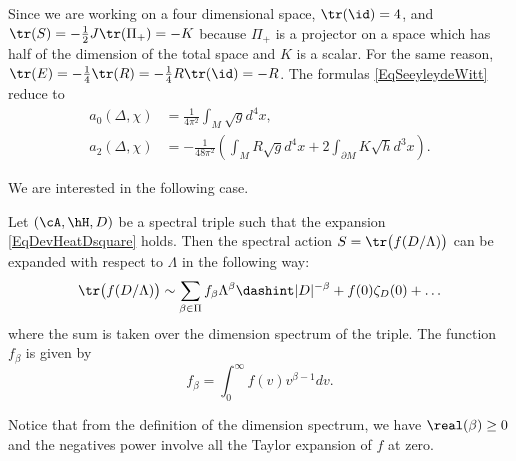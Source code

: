 Since we are working on a four dimensional space, $\tr(\id)=4$, and $\tr(S)=-\frac{ 1 }{2}J\tr(\Pi_+)=-K$ because $\Pi_+$ is a projector on a space which has half of the dimension of the total space and $K$ is a scalar. For the same reason, $\tr(E)=-\frac{ 1 }{ 4 }\tr(R)=-\frac{ 1 }{ 4 }R\tr(\id)=-R$. The formulas \eqref{EqSeeyleydeWitt} reduce to
\begin{subequations}
\begin{align}
a_0(\Delta,\chi)	&=\frac{1}{ 4\pi^2 }\int_M\sqrt{g}d^4x,\\
a_2(\Delta,\chi)	&=-\frac{1}{ 48\pi^2 }\left( \int_M R\sqrt{g}d^4x + 2\int_{\partial M}K\sqrt{h}d^3x \right).
\end{align}
\end{subequations}

We are interested in the following case.

\begin{theorem}			\label{ThoExpActSpect}
Let $(\cA,\hH,D)$ be a spectral triple such that the expansion \eqref{EqDevHeatDsquare} holds. Then the spectral action $S=\tr\big( f(D/\Lambda) \big)$ can be expanded with respect to $\Lambda$ in the following way:
\begin{equation}
\tr\big( f(D/\Lambda) \big)\sim\sum_{\beta\in\Pi}f_{\beta}\Lambda^{\beta}\dashint| D |^{-\beta}+f(0)\zeta_D(0)+\ldots
\end{equation}
where the sum is taken over the dimension spectrum of the triple. The function $f_{\beta}$ is given by
\begin{equation}			\label{Eqfbetaintdonne}
  f_{\beta}=\int_0^{\infty}f(v)v^{\beta-1}dv.
\end{equation}
\end{theorem}

Notice that from the definition of the dimension spectrum, we have $\real(\beta)\geq 0$ and the negatives power involve all the Taylor expansion of $f$ at zero.

